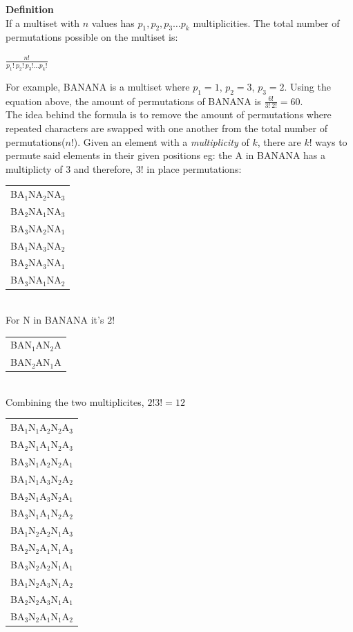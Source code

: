 \documentclass[a4paper,11pt]{article}
\begin{document}
\textbf{Definition}\\
If a multiset with $n$ values has $p_1, p_2, p_3 \dots p_k$ multiplicities. The total number of permutations possible on the multiset is:
\begin{center}
\large{$\frac{n!}{p_1!~p_2!~p_3! \dots p_k!}$}
\end{center}
For example, BANANA is a multiset where $p_1=1$, $p_2=3$, $p_3=2$. Using the equation above, the amount of permutations of BANANA is $\frac{6!}{3!~2!}=60$.\vspace{5pt}\\
The idea behind the formula is to remove the amount of permutations where repeated characters are swapped with one another from the total number of permutations($n!$).
Given an element with a \textit{multiplicity} of $k$, there are $k!$ ways to permute said elements in their given positions eg: the A in BANANA has a multiplicty of $3$ and therefore, $3!$ in place permutations:\vspace{10pt}\\
\begin{tabular}{|c|}
\hline
BA$_1$NA$_2$NA$_3$\\
BA$_2$NA$_1$NA$_3$\\
BA$_3$NA$_2$NA$_1$\\
BA$_1$NA$_3$NA$_2$\\
BA$_2$NA$_3$NA$_1$\\
BA$_3$NA$_1$NA$_2$\\
\hline
\end{tabular}\vspace{10pt}\\
For N in BANANA it's $2!$\vspace{10pt}\\
\begin{tabular}{|c|}
\hline
BAN$_1$AN$_2$A\\
BAN$_2$AN$_1$A\\
\hline
\end{tabular}\vspace{10pt}\\
Combining the two multiplicites, $2!3!=12$\vspace{10pt}\\
\begin{tabular}{|c|}
\hline
BA$_1$N$_1$A$_2$N$_2$A$_3$\\
BA$_2$N$_1$A$_1$N$_2$A$_3$\\
BA$_3$N$_1$A$_2$N$_2$A$_1$\\
BA$_1$N$_1$A$_3$N$_2$A$_2$\\
BA$_2$N$_1$A$_3$N$_2$A$_1$\\
BA$_3$N$_1$A$_1$N$_2$A$_2$\\
\hline
BA$_1$N$_2$A$_2$N$_1$A$_3$\\
BA$_2$N$_2$A$_1$N$_1$A$_3$\\
BA$_3$N$_2$A$_2$N$_1$A$_1$\\
BA$_1$N$_2$A$_3$N$_1$A$_2$\\
BA$_2$N$_2$A$_3$N$_1$A$_1$\\
BA$_3$N$_2$A$_1$N$_1$A$_2$\\
\hline
\end{tabular}\vspace{10pt}\\
\end{document}
